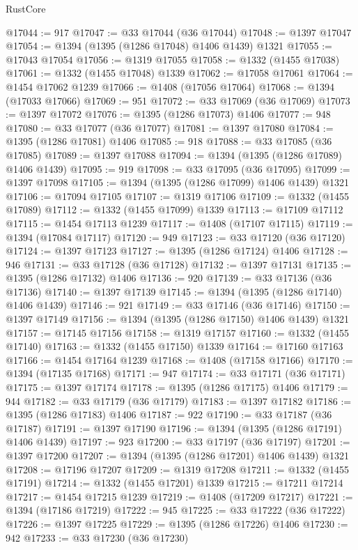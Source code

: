 \begin{lexlean}{RustCore}
\begin{coremodule}
@17044 := 917
@17047 := @33 @17044 (@36 @17044)
@17048 := @1397 @17047
@17054 := @1394 (@1395 (@1286 @17048) @1406 @1439) @1321
@17055 := @17043 @17054
@17056 := @1319 @17055
@17058 := @1332 (@1455 @17038)
@17061 := @1332 (@1455 @17048) @1339
@17062 := @17058 @17061
@17064 := @1454 @17062 @1239
@17066 := @1408 (@17056 @17064)
@17068 := @1394 (@17033 @17066)
@17069 := 951
@17072 := @33 @17069 (@36 @17069)
@17073 := @1397 @17072
@17076 := @1395 (@1286 @17073) @1406
@17077 := 948
@17080 := @33 @17077 (@36 @17077)
@17081 := @1397 @17080
@17084 := @1395 (@1286 @17081) @1406
@17085 := 918
@17088 := @33 @17085 (@36 @17085)
@17089 := @1397 @17088
@17094 := @1394 (@1395 (@1286 @17089) @1406 @1439)
@17095 := 919
@17098 := @33 @17095 (@36 @17095)
@17099 := @1397 @17098
@17105 := @1394 (@1395 (@1286 @17099) @1406 @1439) @1321
@17106 := @17094 @17105
@17107 := @1319 @17106
@17109 := @1332 (@1455 @17089)
@17112 := @1332 (@1455 @17099) @1339
@17113 := @17109 @17112
@17115 := @1454 @17113 @1239
@17117 := @1408 (@17107 @17115)
@17119 := @1394 (@17084 @17117)
@17120 := 949
@17123 := @33 @17120 (@36 @17120)
@17124 := @1397 @17123
@17127 := @1395 (@1286 @17124) @1406
@17128 := 946
@17131 := @33 @17128 (@36 @17128)
@17132 := @1397 @17131
@17135 := @1395 (@1286 @17132) @1406
@17136 := 920
@17139 := @33 @17136 (@36 @17136)
@17140 := @1397 @17139
@17145 := @1394 (@1395 (@1286 @17140) @1406 @1439)
@17146 := 921
@17149 := @33 @17146 (@36 @17146)
@17150 := @1397 @17149
@17156 := @1394 (@1395 (@1286 @17150) @1406 @1439) @1321
@17157 := @17145 @17156
@17158 := @1319 @17157
@17160 := @1332 (@1455 @17140)
@17163 := @1332 (@1455 @17150) @1339
@17164 := @17160 @17163
@17166 := @1454 @17164 @1239
@17168 := @1408 (@17158 @17166)
@17170 := @1394 (@17135 @17168)
@17171 := 947
@17174 := @33 @17171 (@36 @17171)
@17175 := @1397 @17174
@17178 := @1395 (@1286 @17175) @1406
@17179 := 944
@17182 := @33 @17179 (@36 @17179)
@17183 := @1397 @17182
@17186 := @1395 (@1286 @17183) @1406
@17187 := 922
@17190 := @33 @17187 (@36 @17187)
@17191 := @1397 @17190
@17196 := @1394 (@1395 (@1286 @17191) @1406 @1439)
@17197 := 923
@17200 := @33 @17197 (@36 @17197)
@17201 := @1397 @17200
@17207 := @1394 (@1395 (@1286 @17201) @1406 @1439) @1321
@17208 := @17196 @17207
@17209 := @1319 @17208
@17211 := @1332 (@1455 @17191)
@17214 := @1332 (@1455 @17201) @1339
@17215 := @17211 @17214
@17217 := @1454 @17215 @1239
@17219 := @1408 (@17209 @17217)
@17221 := @1394 (@17186 @17219)
@17222 := 945
@17225 := @33 @17222 (@36 @17222)
@17226 := @1397 @17225
@17229 := @1395 (@1286 @17226) @1406
@17230 := 942
@17233 := @33 @17230 (@36 @17230)

\end{coremodule}
\end{lexlean}
